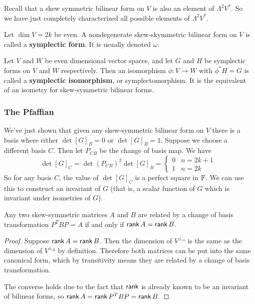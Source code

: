 \begin{remark*}
    Recall that a skew symmetric bilinear form on $V$ is also an element of $\Lambda^2 V^*$. So we have just completely characterized all possible elements of $\Lambda^2 V^*$.
\end{remark*}
\begin{defn}
    Let $\dim V = 2k$ be even. A nondegenerate skew-skymmetric bilinear form on $V$ is called a \textbf{symplectic form}. It is usually denoted $\omega$.
\end{defn}
\begin{defn}
    Let $V$ and $W$ be even dimensional vector spaces, and let $G$ and $H$ be symplectic forms on $V$ and $W$ respectively. Then an isomorphism $\phi : V \to W$ with $\phi^* H = G$ is called a \textbf{symplectic isomorphism}, or symplectomorphism. It is the equivalent of an isometry for skew-symmetric bilinear forms.
\end{defn}
\subsubsection{The Pfaffian}
We've just shown that given any skew-symmetric bilinear form on $V$ there is a basis where either $\det [G]_B = 0$ or $\det [G]_B = 1$. Suppose we choose a different basis $C$. Then let $P_{CB}$ be the change of basis map. We have
\[\det [G]_C = \det(P_{CB})^2 \det [G]_B = \begin{cases}0&n=2k+1\\1&n=2k\end{cases}\]
So for any basis $C$, the value of $\det [G]_C$ is a perfect square in $\operatorname{\mathbb{F}}$. We can use this to construct an invariant of $G$ (that is, a scalar function of $G$ which is invariant under isometries of $G$).
\begin{cor}
    Any two skew-symmetric matrices $A$ and $B$ are related by a change of basis transformation $P^T B P = A$ if and only if $\operatorname{\textsf{rank}} A = \operatorname{\textsf{rank}} B$.
\end{cor}
\begin{proof}
    Suppose $\operatorname{\textsf{rank}} A = \operatorname{\textsf{rank}} B$. Then the dimension of $V^{\perp_A}$ is the same as the dimension of $V^{\perp_B}$ by definition. Therefore both matrices can be put into the same canonical form, which by transitivity means they are related by a change of basis transformation.
    
    The converse holds due to the fact that $\operatorname{\textsf{rank}}$ is already known to be an invariant of bilinear forms, so $\operatorname{\textsf{rank}} A = \operatorname{\textsf{rank}} P^T B P = \operatorname{\textsf{rank}} B$.
\end{proof}

